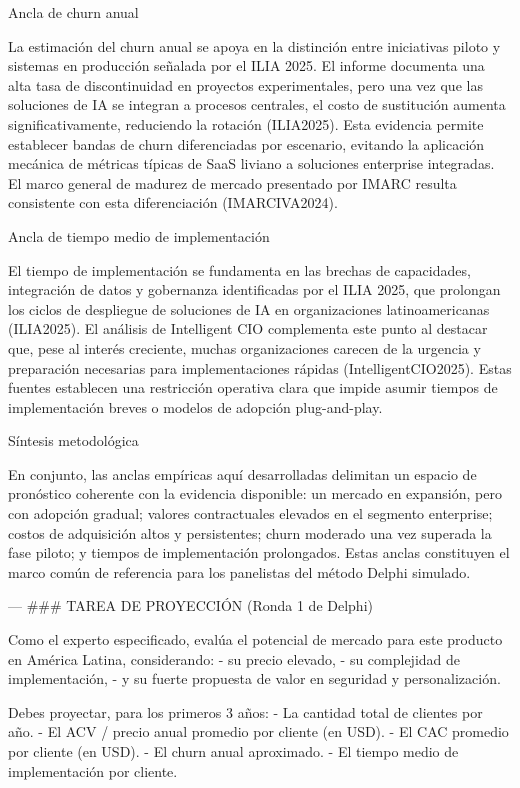 \begin{APACode}
Ancla de churn anual

La estimación del churn anual se apoya en la distinción entre iniciativas piloto y sistemas en producción señalada por el ILIA 2025. El informe documenta una alta tasa de discontinuidad en proyectos experimentales, pero una vez que las soluciones de IA se integran a procesos centrales, el costo de sustitución aumenta significativamente, reduciendo la rotación (ILIA2025). Esta evidencia permite establecer bandas de churn diferenciadas por escenario, evitando la aplicación mecánica de métricas típicas de SaaS liviano a soluciones enterprise integradas. El marco general de madurez de mercado presentado por IMARC resulta consistente con esta diferenciación (IMARCIVA2024).

Ancla de tiempo medio de implementación

El tiempo de implementación se fundamenta en las brechas de capacidades, integración de datos y gobernanza identificadas por el ILIA 2025, que prolongan los ciclos de despliegue de soluciones de IA en organizaciones latinoamericanas (ILIA2025). El análisis de Intelligent CIO complementa este punto al destacar que, pese al interés creciente, muchas organizaciones carecen de la urgencia y preparación necesarias para implementaciones rápidas (IntelligentCIO2025). Estas fuentes establecen una restricción operativa clara que impide asumir tiempos de implementación breves o modelos de adopción plug-and-play.

Síntesis metodológica

En conjunto, las anclas empíricas aquí desarrolladas delimitan un espacio de pronóstico coherente con la evidencia disponible: un mercado en expansión, pero con adopción gradual; valores contractuales elevados en el segmento enterprise; costos de adquisición altos y persistentes; churn moderado una vez superada la fase piloto; y tiempos de implementación prolongados. Estas anclas constituyen el marco común de referencia para los panelistas del método Delphi simulado.

---
### TAREA DE PROYECCIÓN (Ronda 1 de Delphi)

Como el experto especificado, evalúa el potencial de mercado para este producto en América Latina, considerando:
- su precio elevado,
- su complejidad de implementación,
- y su fuerte propuesta de valor en seguridad y personalización.

Debes proyectar, para los primeros 3 años:
- La cantidad total de clientes por año.
- El ACV / precio anual promedio por cliente (en USD).
- El CAC promedio por cliente (en USD).
- El churn anual aproximado.
- El tiempo medio de implementación por cliente.


\end{APACode}
